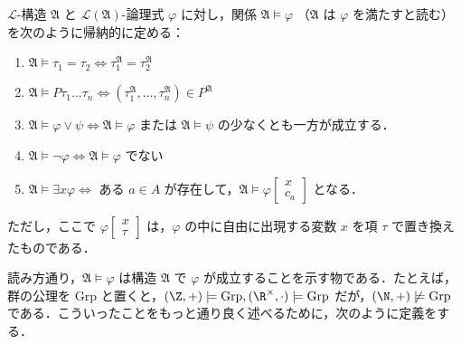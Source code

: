 \documentclass[a4j,xelatex,ja=standard]{ltjsarticle}
\begin{document}
\begin{definition}[充足関係]
 $\mathcal{L}$-構造 $\mathfrak{A}$ と $\mathcal{L}(\mathfrak{A})$-論理式 $\varphi$ に対し，関係 $\mathfrak{A} \models \varphi$ （$\mathfrak{A}$ は $\varphi$ を満たすと読む）を次のように帰納的に定める：
 \begin{enumerate}
  \item $\mathfrak{A} \models \tau_1 = \tau_2 \Longleftrightarrow \tau_1^\mathfrak{A} = \tau_2^\mathfrak{A}$
  \item $\mathfrak{A} \models P\tau_1 \dots \tau_n \Longleftrightarrow (\tau_1^\mathfrak{A}, \dots, \tau_n^\mathfrak{A}) \in P^\mathfrak{A}$
  \item $\mathfrak{A} \models \varphi \vee \psi \Longleftrightarrow \mathfrak{A} \models \varphi$ または $\mathfrak{A} \models \psi$ の少なくとも一方が成立する．
  \item $\mathfrak{A} \models \neg \varphi \Longleftrightarrow \mathfrak{A} \models \varphi$ でない
  \item $\mathfrak{A} \models \exists x \varphi \Longleftrightarrow$ ある $a \in A$ が存在して，$\mathfrak{A} \models \varphi[\begin{smallmatrix}x\\c_a\end{smallmatrix}]$ となる．
 \end{enumerate}
 ただし，ここで $\varphi[\begin{smallmatrix}x\\\tau\end{smallmatrix}]$ は，$\varphi$ の中に自由に出現する変数 $x$ を項 $\tau$ で置き換えたものである．
\end{definition}

読み方通り，$\mathfrak{A} \models \varphi$ は構造 $\mathfrak{A}$ で $\varphi$ が成立することを示す物である．たとえば，群の公理を $\mathrm{Grp}$ と置くと，$(\Z, +) \models \mathrm{Grp}, (\R^\times, \cdot) \models \mathrm{Grp}$ だが，$(\N, +) \not\models \mathrm{Grp}$ である．こういったことをもっと通り良く述べるために，次のように定義をする．
\end{document}
